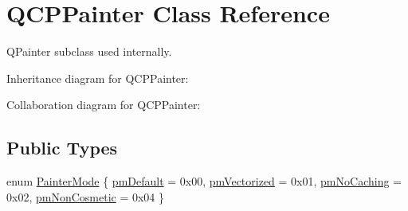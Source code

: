 \hypertarget{classQCPPainter}{}\section{Q\+C\+P\+Painter Class Reference}
\label{classQCPPainter}


Q\+Painter subclass used internally.  




Inheritance diagram for Q\+C\+P\+Painter\+:


Collaboration diagram for Q\+C\+P\+Painter\+:
\subsection*{Public Types}
\begin{DoxyCompactItemize}
\item 
enum \hyperlink{classQCPPainter_a156cf16444ff5e0d81a73c615fdb156d}{Painter\+Mode} \{ \hyperlink{classQCPPainter_a156cf16444ff5e0d81a73c615fdb156da3bac5e87e3d58553b297befb4eee2a45}{pm\+Default} = 0x00, 
\hyperlink{classQCPPainter_a156cf16444ff5e0d81a73c615fdb156daeda679cd55dcd468341d07d48a30b6ab}{pm\+Vectorized} = 0x01, 
\hyperlink{classQCPPainter_a156cf16444ff5e0d81a73c615fdb156dae78f9a4eb277a5f9207f50850a51a0b0}{pm\+No\+Caching} = 0x02, 
\hyperlink{classQCPPainter_a156cf16444ff5e0d81a73c615fdb156dac1e481bfaf408f2bd2eaad3ec341f36b}{pm\+Non\+Cosmetic} = 0x04
 \}
\end{DoxyCompactItemize}
